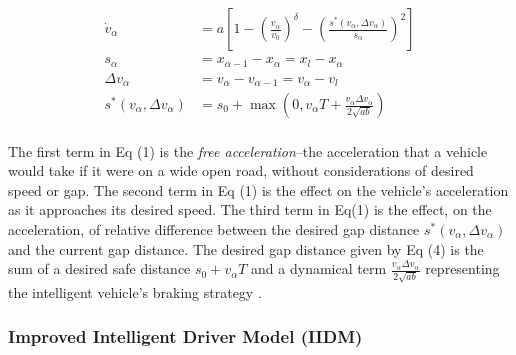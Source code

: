 \documentclass[12pt]{article}
\begin{document}
\begin{mymathbox}[ams gather, title=IDM Governing Equations, colframe=blue!30!black]
  \begin{align}
  \dot{v}_\alpha &= a \left[1 - \left(\frac{v_\alpha}{v_0}\right)^{\delta} - \left(\frac{s^*(v_\alpha,\Delta v_\alpha)}{s_\alpha}\right)^{2}\right]\\
  s_\alpha &= x_{\alpha-1}-x_\alpha=x_{l}-x_\alpha\\
  \Delta v_\alpha &=v_\alpha-v_{\alpha-1}=v_\alpha-v_l\\
  s^*(v_\alpha, \Delta v_\alpha) &= s_0 + \max\left(0, v_\alpha T + \frac{v_\alpha \Delta v_\alpha}{2 \sqrt{ab}} \right)
  \end{align}
\end{mymathbox}
\paragraph{}
The first term in Eq (1) is the \textit{free acceleration}\---the acceleration that a vehicle would take if it were on a wide open road, without considerations of desired speed or gap.  The second term in Eq (1) is the effect on the vehicle's acceleration as it approaches its desired speed.  The third term in Eq(1) is the effect, on the acceleration, of relative difference between the desired gap distance $s^*(v_\alpha,\Delta v_\alpha)$ and the current gap distance.  The desired gap distance given by Eq (4) is the sum of a desired safe distance $s_0+v_\alpha T$ and a dynamical term $\frac{v_\alpha \Delta v_\alpha}{2 \sqrt{ab}}$ representing the intelligent vehicle's braking strategy \cite{intelligent_driver_model}.

\subsubsection{Improved Intelligent Driver Model (IIDM)}
\end{document}
